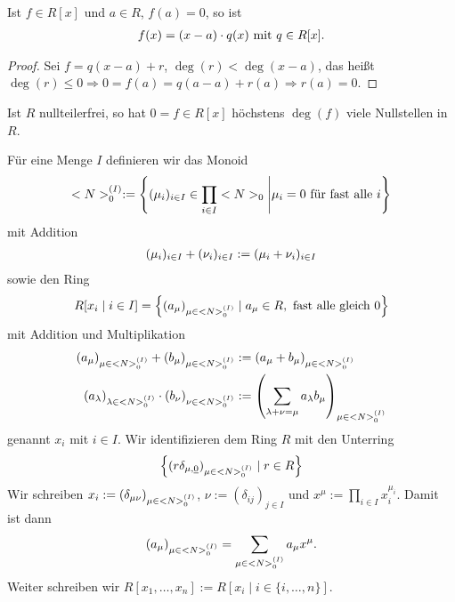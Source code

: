 \begin{conclusion}
	Ist $f \in R[x]$ und $a \in R$, $f(a) = 0$, so ist
	\begin{align}
		f(x) = (x-a)\cdot q(x) \text{ mit } q \in R[x]. \notag
	\end{align}
\end{conclusion}

\begin{proof}
	Sei $f = q(x-a) + r$, $\deg(r) < \deg(x-a)$, das heißt $\deg(r) \leq 0 \Rightarrow 0 = f(a) = q(a-a) + r(a) \Rightarrow r(a) = 0$.
\end{proof}

\begin{conclusion}
	Ist $R$ nullteilerfrei, so hat $0 = f \in R[x]$ höchstens $\deg(f)$ viele Nullstellen in $R$.
\end{conclusion}

\begin{definition}
	Für eine Menge $I$ definieren wir das Monoid
	\begin{align}
	<N>_{0}^{(I)} : = \left\{ (\mu_i)_{i \in I} \in \prod_{i \in I} <N>_{0} \Bigg| \mu_i = 0 \text{ für fast alle } i \right\}\notag
	\end{align}
	mit Addition
	\begin{align}
		(\mu_i)_{i \in I} + (\nu_i)_{i \in I} :=(\mu_i+\nu_i)_{i \in I} \notag
	\end{align}
	sowie den Ring
	\begin{align}
		R[x_i \mid i \in I] = \left\{ (a_{\mu})_{\mu \in <N>_{0}^{(I)}} \mid a_{\mu} \in R, \text{ fast alle gleich } 0\right\} \notag
	\end{align}
	mit Addition und Multiplikation
	\begin{align}
		(a_{\mu})_{\mu \in <N>_{0}^{(I)}} + (b_{\mu})_{\mu \in <N>_{0}^{(I)}} &:= (a_{\mu} + b_{\mu})_{\mu \in <N>_{0}^{(I)}}\notag \\
		(a_{\lambda})_{\lambda \in <N>_{0}^{(I)}}\cdot (b_{\nu})_{\nu \in <N>_{0}^{(I)}} &:= \left( \sum_{\lambda + \nu = \mu} a_{\lambda}b_{\mu}\right)_{\mu \in <N>_{0}^{(I)}} \notag
	\end{align}
	genannt  $x_i$ mit $i \in I$. Wir identifizieren dem Ring $R$ mit den Unterring
	\begin{align}
		\left\{ (r\delta_{\mu,\underline{0}})_{\mu \in <N>_{0}^{(I)}}\mid r \in R \right\} \notag
	\end{align}
	Wir schreiben $x_i := (\delta_{\mu\nu})_{\mu \in <N>_{0}^{(I)}}$, $\nu := (\delta_{ij})_{j \in I}$ und $x^{\mu} := \prod_{i \in I}x_i^{\mu_i}$. Damit ist dann
	\begin{align}
		(a_{\mu})_{\mu \in <N>_{0}^{(I)}} = \sum_{\mu \in <N>_{0}^{(I)}} a_{\mu} x^{\mu}. \notag
	\end{align}
	Weiter schreiben wir $R[x_1, \dots, x_n] := R[x_i \mid i \in \{ i, \dots, n \}]$.
\end{definition}

